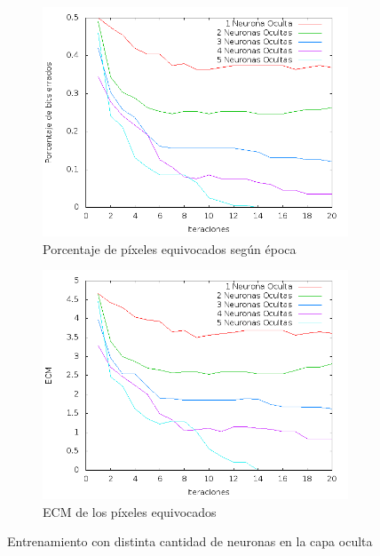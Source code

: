 \documentclass[12pt]{article}
\begin{document}
\begin{figure}[!ht]
\centering
    \begin{subfigure}[b]{0.5\textwidth}            
            \centering
            \includegraphics[width=\textwidth]{graficosde3neuronas/imagenDistancia}
            \caption{Porcentaje de p\'ixeles equivocados seg\'un \'epoca}
            \label{fig:dist_3}
    \end{subfigure}%
    \begin{subfigure}[b]{0.5\textwidth}
            \centering
            \includegraphics[width=\textwidth]{graficosde3neuronas/imagenECM}
            \caption{ECM de los p\'ixeles equivocados}
            \label{fig:ecm_3}
    \end{subfigure}
    \caption{Entrenamiento con distinta cantidad de neuronas en la capa oculta}
  \label{fig:graph3}
\end{figure}
\end{document}
